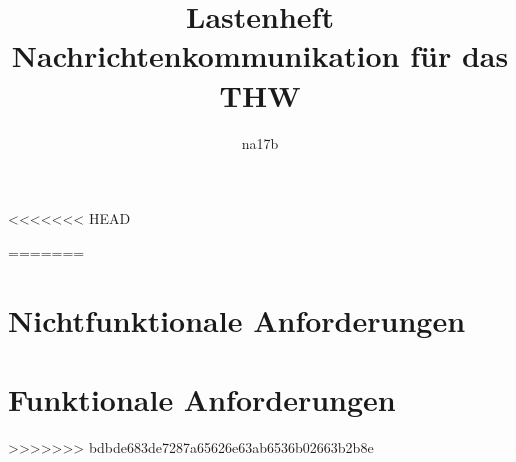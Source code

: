 \documentclass[a4paper,11pt,oneside, titlepage]{article}
\title{Lastenheft\\Nachrichtenkommunikation für das THW}
\author{na17b}
\date{}
\begin{document}
\maketitle


\tableofcontents


\newpage

<<<<<<< HEAD




=======





\section{Nichtfunktionale Anforderungen}







\section{Funktionale Anforderungen}


\newpage













\newpage
\glsaddall
\printglossaries
>>>>>>> bdbde683de7287a65626e63ab6536b02663b2b8e
\end{document}
